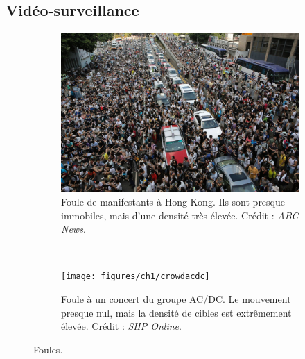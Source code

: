 \begin{appendices}
	\addtocounter{footnote}{-2}
	\addtocounter{footnote}{1}
	\addtocounter{footnote}{1}



\section{Vidéo-surveillance}

	\begin{figure}[!htbp]
		\begin{subfigure}[t]{0.49\textwidth}
			\centering
			\includegraphics[width=\textwidth]{figures/ch1/crowdhk}
			\caption[Foule de manifestants à Hong-Kong]{Foule de manifestants à Hong-Kong. Ils sont presque immobiles, mais d'une densité très élevée. Crédit : \emph{ABC News}.}
			\label{fig:crowdhk}
		\end{subfigure}
		~
		\begin{subfigure}[t]{0.49\textwidth}
			\centering
			\texttt{[image: figures/ch1/crowdacdc]}
			\caption[Foule à un concert]{Foule à un concert du groupe AC/DC. Le mouvement presque nul, mais la densité de cibles est extrêmement élevée. Crédit : \emph{SHP Online}\footnotemark.}
			\label{fig:crowdacdc}
		\end{subfigure}
		\label{fig:crowds}
		\caption{Foules.}
	\end{figure}
	








\end{appendices}
